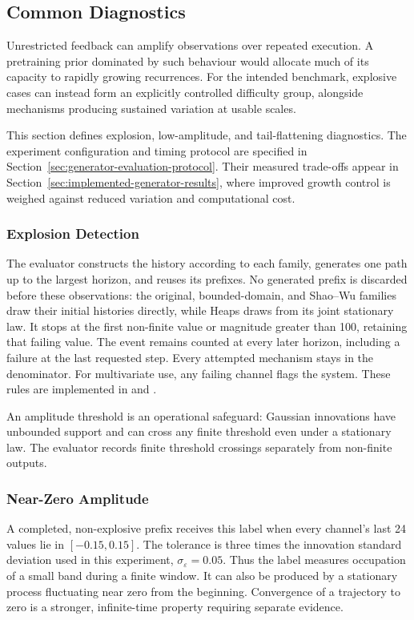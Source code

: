 \subsection{Common Diagnostics}
\label{sec:generator-diagnostics}

Unrestricted feedback can amplify observations over repeated execution.
A pretraining prior dominated by such behaviour would allocate much
of its capacity to rapidly growing recurrences. For the intended benchmark,
explosive cases can instead form an explicitly controlled difficulty group,
alongside mechanisms producing sustained variation at usable scales.

This section defines explosion, low-amplitude, and tail-flattening diagnostics.
The experiment configuration and timing protocol are specified in
Section~\ref{sec:generator-evaluation-protocol}. Their measured trade-offs
appear in Section~\ref{sec:implemented-generator-results}, where improved
growth control is weighed against reduced variation and computational cost.

\subsubsection{Explosion Detection}

The evaluator constructs the history according to each family, generates one
path up to the largest horizon, and reuses its prefixes. No generated prefix
is discarded before these observations: the original, bounded-domain, and
Shao--Wu families draw their initial histories directly, while Heaps draws
from its joint stationary law. It stops at the first
non-finite value or magnitude greater than 100, retaining that failing value.
The event remains counted at every later horizon, including a failure at the
last requested step. Every attempted mechanism stays in the denominator.
For multivariate use, any failing channel flags the system. These rules are
implemented in  and
.

An amplitude threshold is an operational safeguard: Gaussian innovations have
unbounded support and can cross any finite threshold even under a stationary
law. The evaluator records finite threshold crossings separately from
non-finite outputs.

\subsubsection{Near-Zero Amplitude}
A completed, non-explosive prefix receives this label when every channel's
last 24 values lie in $[-0.15,0.15]$. The tolerance is three times the
innovation standard deviation used in this experiment, $\sigma_\varepsilon=0.05$.
Thus the label measures occupation of a small band during a finite window.
It can also be produced by a stationary process fluctuating near zero from
the beginning. Convergence of a trajectory to zero is a stronger,
infinite-time property requiring separate evidence.

